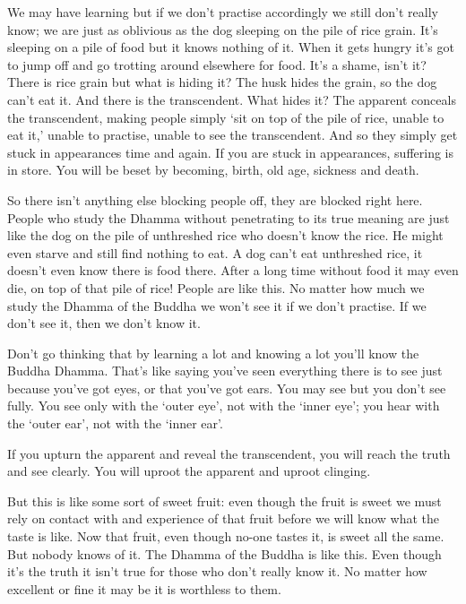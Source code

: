 We may have learning but if we don't practise accordingly we still don't really know; we are just as oblivious as the dog sleeping on the pile of rice grain. It's sleeping on a pile of food but it knows nothing of it. When it gets hungry it's got to jump off and go trotting around elsewhere for food. It's a shame, isn't it? There is rice grain but what is hiding it? The husk hides the grain, so the dog can't eat it. And there is the transcendent. What hides it? The apparent conceals the transcendent, making people simply `sit on top of the pile of rice, unable to eat it,' unable to practise, unable to see the transcendent. And so they simply get stuck in appearances time and again. If you are stuck in appearances, suffering is in store. You will be beset by becoming, birth, old age, sickness and death.

So there isn't anything else blocking people off, they are blocked right here. People who study the Dhamma without penetrating to its true meaning are just like the dog on the pile of unthreshed rice who doesn't know the rice. He might even starve and still find nothing to eat. A dog can't eat unthreshed rice, it doesn't even know there is food there. After a long time without food it may even die, on top of that pile of rice! People are like this. No matter how much we study the Dhamma of the Buddha we won't see it if we don't practise. If we don't see it, then we don't know it.

Don't go thinking that by learning a lot and knowing a lot you'll know the Buddha Dhamma. That's like saying you've seen everything there is to see just because you've got eyes, or that you've got ears. You may see but you don't see fully. You see only with the `outer eye', not with the `inner eye'; you hear with the `outer ear', not with the `inner ear'.

If you upturn the apparent and reveal the transcendent, you will reach the truth and see clearly. You will uproot the apparent and uproot clinging.

But this is like some sort of sweet fruit: even though the fruit is sweet we must rely on contact with and experience of that fruit before we will know what the taste is like. Now that fruit, even though no-one tastes it, is sweet all the same. But nobody knows of it. The Dhamma of the Buddha is like this. Even though it's the truth it isn't true for those who don't really know it. No matter how excellent or fine it may be it is worthless to them.

